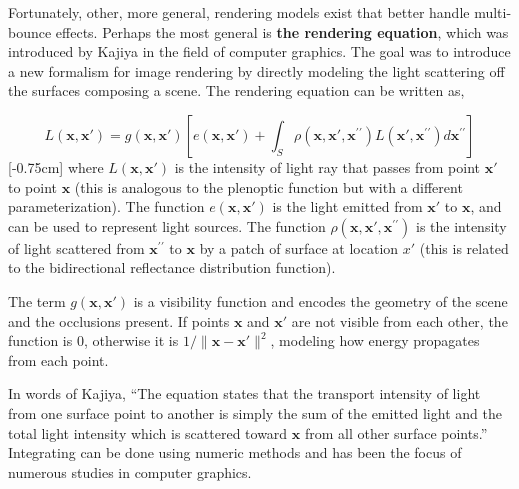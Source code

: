 Fortunately, other, more general, rendering models exist that better handle multi-bounce effects. Perhaps the most general is \textbf{the rendering equation}, which was introduced by Kajiya \cite{Kajiya1986} in the field of computer graphics. The goal was to introduce a new formalism for image rendering by directly modeling the light scattering off the surfaces composing a scene. The rendering equation can be written as,

\begin{equation}
    L(\mathbf{x},\mathbf{x}') = g(\mathbf{x},\mathbf{x}') \left[ e(\mathbf{x},\mathbf{x}') + \int_S \rho(\mathbf{x},\mathbf{x}',\mathbf{x}^{\prime\prime}) L(\mathbf{x}',\mathbf{x}^{\prime\prime}) d\mathbf{x}^{\prime\prime} \right]
    \label{eq:nerf:Kajiya_rendering_equation}
\end{equation}
[-0.75cm]
where $L(\mathbf{x},\mathbf{x}')$ is the intensity of light ray that passes from point $\mathbf{x}'$ to point $\mathbf{x}$ (this is analogous to the plenoptic function but with a different parameterization). The function $e(\mathbf{x},\mathbf{x}')$ is the light emitted from $\mathbf{x}'$ to $\mathbf{x}$, and can be used to represent light sources. The function $\rho(\mathbf{x},\mathbf{x}',\mathbf{x}^{\prime\prime})$ is the intensity of light scattered from $\mathbf{x}^{\prime\prime}$ to $\mathbf{x}$ by a patch of surface at location $x'$ (this is related to the bidirectional reflectance distribution function).


The term $g(\mathbf{x}, \mathbf{x}')$ is a visibility function and encodes the geometry of the scene and the occlusions present. If points $\mathbf{x}$ and $\mathbf{x}'$ are not visible from each other, the function is 0, otherwise it is $1/\lVert \mathbf{x}-\mathbf{x}' \rVert ^2$, modeling how energy propagates from each point.

In words of Kajiya, ``The equation states that the transport intensity of light from one surface point to another is simply the sum of the emitted light and the total light intensity which is scattered toward $\mathbf{x}$ from all other surface points.'' Integrating \eqn{\ref{eq:nerf:Kajiya_rendering_equation}} can be done using numeric methods and has been the focus of numerous studies in computer graphics.


